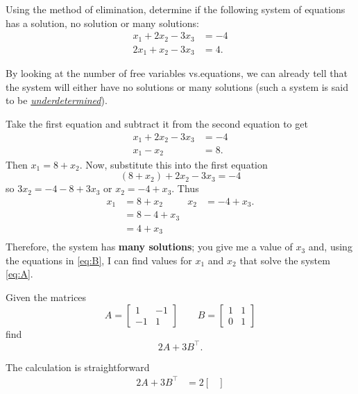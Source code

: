 \begin{questions}
  \question[10] Using the method of elimination, determine if the following
  system of equations has a solution, no solution or many solutions:
  \[
    \label{eq:A}
    \tag{$\star$}
    \begin{aligned}
      x_1+2x_2-3x_3&=-4\\
      2x_1+x_2-3x_3&=4.
    \end{aligned}
  \]
  \begin{solution}
    By looking at the number of free variables vs.\@ equations, we can
    already tell that the system will either have no solutions or many
    solutions (such a system is said to be
    \emph{\href{https://en.wikipedia.org/wiki/Underdetermined_system}{underdetermined}}).

    Take the first equation and subtract it from the second equation to get
    \begin{align*}
      x_1+2x_2-3x_3&=-4\\
      x_1-x_2&=8.
    \end{align*}
    Then $x_1=8+x_2$. Now, substitute this into the first equation
    \[
      (8+x_2)+2x_2-3x_3=-4
    \]
    so $3x_2=-4-8+3x_3$ or $x_2=-4+x_3$. Thus
    \[
      \label{eq:B}
      \tag{$\vardiamondsuit$}
      \begin{aligned}
        x_1&=8+x_2&
        x_2&=-4+x_3.\\
        &=8-4+x_3\\
        &=4+x_3\\
      \end{aligned}
    \]
    Therefore, the system has \textbf{many solutions}; you give me a value
    of $x_3$ and, using the equations in \eqref{eq:B}, I can find values
    for $x_1$ and $x_2$ that solve the system \eqref{eq:A}.
  \end{solution}
  \question[5] Given the matrices
  \[
    A=
    \begin{bmatrix}
      1&-1\\
      -1&1
    \end{bmatrix}
    \qquad
    B=
    \begin{bmatrix}
      1&1\\
      0&1
    \end{bmatrix}
  \]
  find
  \[
    2A+3B^\intercal.
  \]
  \begin{solution}
    The calculation is straightforward
    \begin{align*}
      2A+3B^\intercal
      &=
        2\begin{bmatrix}

\end{bmatrix}
\end{align*}
\end{solution}
\end{questions}
